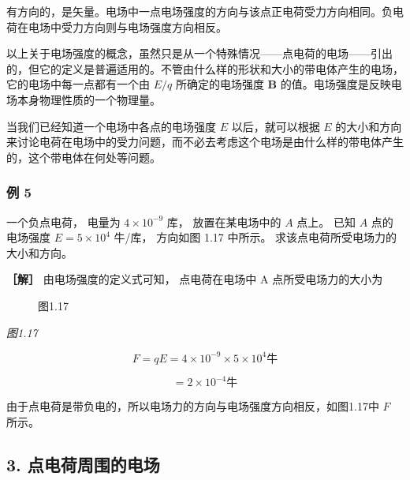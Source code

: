 有方向的，是矢量。电场中一点电场强度的方向与该点正电荷受力方向相同。负电荷在电场中受力方向则与电场强度方向相反。

以上关于电场强度的概念，虽然只是从一个特殊情况------点电荷的电场------引出的，但它的定义是普遍适用的。不管由什么样的形状和大小的带电体产生的电场，它的电场中每一点都有一个由
\(E / q\) 所确定的电场强度 \(\pmb{B}\)
的值。电场强度是反映电场本身物理性质的一个物理量。

当我们已经知道一个电场中各点的电场强度 \(E\) 以后，就可以根据 \(E\)
的大小和方向来讨论电荷在电场中的受力问题，而不必去考虑这个电场是由什么样的带电体产生的，这个带电体在何处等问题。

\subsubsection{例 5}\label{ux4f8b-5}

一个负点电荷， 电量为 \(4 \times 10^{-9}\) 库， 放置在某电场中的 \(A\)
点上。 已知 \(A\) 点的电场强度 \(E = 5 \times 10^{4}\) 牛/库， 方向如图
1.17 中所示。 求该点电荷所受电场力的大小和方向。

\textbf{［解］} 由电场强度的定义式可知， 点电荷在电场中 A
点所受电场力的大小为

\begin{figure}
\centering
{}
\caption{图1.17}
\end{figure}

\emph{图1.17}

\[
F = q E = 4 \times 10^{- 9} \times 5 \times 10^{4} \text{牛}
\]

\[
= 2 \times 10^{- 4} \text{牛}
\]

由于点电荷是带负电的，所以电场力的方向与电场强度方向相反，如图1.17中
\(F\) 所示。

\subsection{3.
点电荷周围的电场}\label{ux70b9ux7535ux8377ux5468ux56f4ux7684ux7535ux573a}

